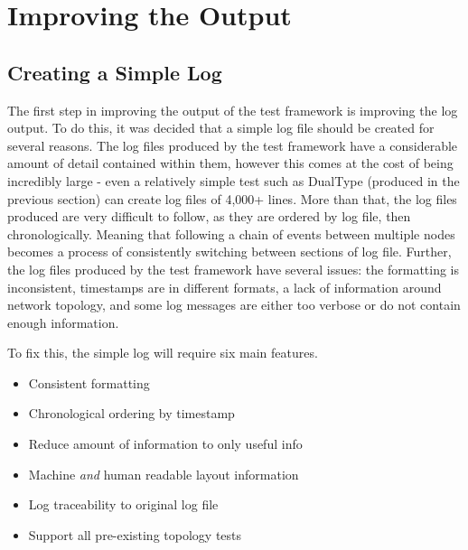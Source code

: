 \chapter{Improving the Output} %

\label{Chapter5} %



\section{Creating a Simple Log}

The first step in improving the output of the test framework is improving the log output.
To do this, it was decided that a simple log file should be created for several reasons.
The log files produced by the test framework have a considerable amount of detail contained within them, however this comes at the cost of being incredibly large - even a relatively simple test such as DualType (produced in the previous section) can create log files of 4,000+ lines.
More than that, the log files produced are very difficult to follow, as they are ordered by log file, then chronologically.
Meaning that following a chain of events between multiple nodes becomes a process of consistently switching between sections of log file.
Further, the log files produced by the test framework have several issues: the formatting is inconsistent, timestamps are in different formats, a lack of information around network topology, and some log messages are either too verbose or do not contain enough information.

To fix this, the simple log will require six main features.
\begin{itemize}
    \item Consistent formatting
    \item Chronological ordering by timestamp
    \item Reduce amount of information to only useful info
    \item Machine \emph{and} human readable layout information
    \item Log traceability to original log file
    \item Support all pre-existing topology tests
\end{itemize}


